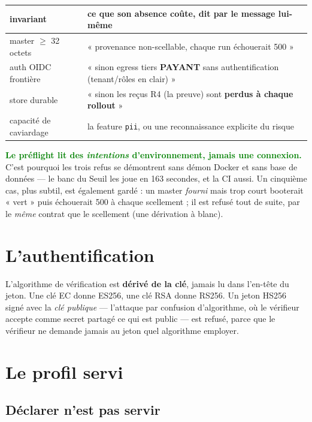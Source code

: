 \documentclass[10pt]{report}
\newcommand{\code}[1]{\texttt{\small #1}}
\newcommand{\ok}[1]{\textcolor{green}{\textbf{#1}}}
\begin{document}
\begin{longtable}{@{}p{4.2cm} p{10.8cm}@{}}
\toprule \textbf{invariant} & \textbf{ce que son absence coûte, dit par le message lui-même} \\ \midrule \endhead
master $\geq$ 32 octets & « provenance non-scellable, chaque run échouerait 500 » \\
auth OIDC frontière & « sinon egress tiers \textbf{PAYANT} sans authentification (tenant/rôles en clair) » \\
store durable & « sinon les reçus R4 (la preuve) sont \textbf{perdus à chaque rollout} » \\
capacité de caviardage & la feature \code{pii}, ou une reconnaissance explicite du risque \\
\bottomrule
\end{longtable}

\ok{Le préflight lit des \emph{intentions} d'environnement, jamais une connexion.} C'est pourquoi
les trois refus se démontrent sans démon Docker et sans base de données --- le banc du Seuil les
joue en 163 secondes, et la CI aussi. Un cinquième cas, plus subtil, est également gardé : un master
\emph{fourni} mais trop court booterait « vert » puis échouerait 500 à chaque scellement ; il est
refusé tout de suite, par le \emph{même} contrat que le scellement (une dérivation à blanc).

\section{L'authentification}

\begin{acquis}
L'algorithme de vérification est \textbf{dérivé de la clé}, jamais lu dans l'en-tête du jeton. Une
clé EC donne ES256, une clé RSA donne RS256. Un jeton HS256 signé avec la \emph{clé publique} ---
l'attaque par confusion d'algorithme, où le vérifieur accepte comme secret partagé ce qui est
public --- est refusé, parce que le vérifieur ne demande jamais au jeton quel algorithme employer.
\end{acquis}

\section{Le profil servi}

\subsection{Déclarer n'est pas servir}
\end{document}
